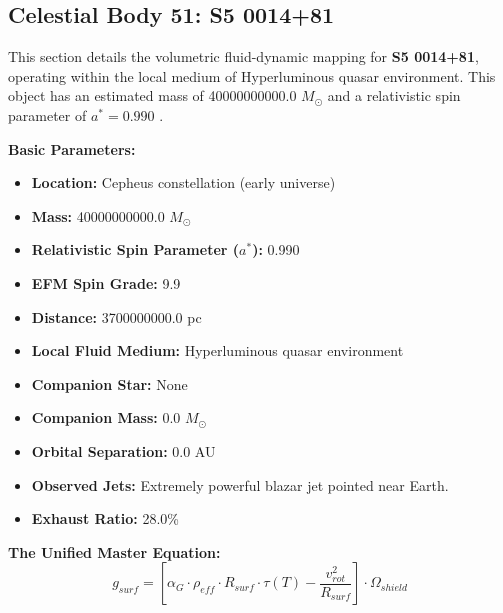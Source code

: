 \documentclass[11pt, a4paper]{article}
\begin{document}
\clearpage
\subsection{Celestial Body 51: S5 0014+81}
This section details the volumetric fluid-dynamic mapping for \textbf{S5 0014+81}, operating within the local medium of Hyperluminous quasar environment. This object has an estimated mass of 40000000000.0 $M_{\odot}$ and a relativistic spin parameter of $a^* = 0.990$ \cite{ghisellini2010, ned}.

\vspace{0.5em}
\noindent \textbf{Basic Parameters:}
\begin{itemize}
  \item \textbf{Location:} Cepheus constellation (early universe)
  \item \textbf{Mass:} 40000000000.0 $M_{\odot}$
  \item \textbf{Relativistic Spin Parameter ($a^*$):} 0.990
  \item \textbf{EFM Spin Grade:} 9.9
  \item \textbf{Distance:} 3700000000.0 pc
  \item \textbf{Local Fluid Medium:} Hyperluminous quasar environment
  \item \textbf{Companion Star:} None
  \item \textbf{Companion Mass:} 0.0 $M_{\odot}$
  \item \textbf{Orbital Separation:} 0.0 AU
  \item \textbf{Observed Jets:} Extremely powerful blazar jet pointed near Earth.
  \item \textbf{Exhaust Ratio:} 28.0\%
\end{itemize}

\vspace{0.5em}
\noindent \textbf{The Unified Master Equation:}
$$ g_{surf} = \left[ \alpha_G \cdot \rho_{eff} \cdot R_{surf} \cdot \tau(T) - \frac{v_{rot}^2}{R_{surf}} \right] \cdot \Omega_{shield} $$
\end{document}
